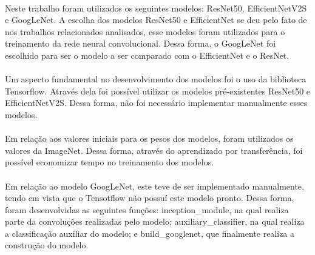\documentclass[12pt]{article}
\begin{document}
\paragraph{}Neste trabalho foram utilizados os seguintes modelos: ResNet50\cite{he2015deepresiduallearningimage}, EfficientNetV2S\cite{tan2021efficientnetv2smallermodelsfaster} e GoogLeNet\cite{szegedy2014goingdeeperconvolutions}. A escolha dos modelos ResNet50 e EfficientNet se deu pelo fato de nos trabalhos relacionados analisados, esse modelos foram utilizados para o treinamento da rede neural convolucional. Dessa forma, o GoogLeNet foi escolhido para ser o modelo a ser comparado com o EfficientNet e o ResNet.

\paragraph{}Um aspecto fundamental no desenvolvimento dos modelos foi o uso da biblioteca Tensorflow. Através dela foi possível utilizar os modelos pré-existentes ResNet50 e EfficientNetV2S. Dessa forma, não foi necessário implementar manualmente esses modelos.

\paragraph{}Em relação aos valores iniciais para os pesos dos modelos, foram utilizados os valores da ImageNet. Dessa forma, através do aprendizado por transferência, foi possível economizar tempo no treinamento dos modelos.





\paragraph{}Em relação ao modelo GoogLeNet, este teve de ser implementado manualmente, tendo em vista que o Tensotflow não possuí este modelo pronto. Dessa forma, foram desenvolvidas as seguintes funções: inception\_module, na qual realiza parte da convoluções realizadas pelo modelo;  auxiliary\_classifier, na qual realiza a classificação auxiliar do modelo; e build\_googlenet, que finalmente realiza a construção do modelo.
\end{document}
